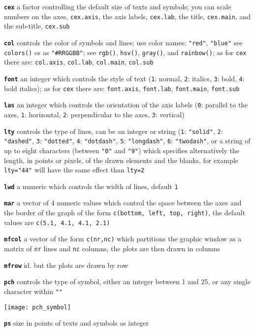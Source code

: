 \documentclass[8pt,landscape]{article}
\newcommand{\code}{\texttt}
\newcommand{\bcode}[1]{\texttt{\textbf{#1}}}
\begin{document}
\begin{multicols*}{3}
\bcode{cex}  a factor controlling the default size of texts and symbols; you can scale numbers on the axes, \code{cex.axis}, the axis labels, \code{cex.lab}, the title, \code{cex.main}, and the sub-title, \code{cex.sub}

\bcode{col}  controls the color of symbols and lines; use color names:
\code{"red"}, \code{"blue"} see \code{colors()} or as \code{"\#RRGGBB"};
see \code{rgb()}, \code{hsv()}, \code{gray()}, and \code{rainbow()}; as for \code{cex} there are: \code{col.axis}, \code{col.lab}, \code{col.main}, \code{col.sub}

\bcode{font}  an integer which controls the style of text (\code{1}: normal, \code{2}: italics, \code{3}: bold, \code{4}: bold italics); as for \code{cex} there are: \code{font.axis}, \code{font.lab}, \code{font.main}, \code{font.sub}

\bcode{las}  an integer which controls the orientation of the axis labels (\code{0}: parallel to the axes, \code{1}: horizontal, \code{2}: perpendicular to the axes, \code{3}: vertical)

\bcode{lty}  controls the type of lines, can be an integer or string (\code{1}: \code{"solid"}, \code{2}: \code{"dashed"}, \code{3}: \code{"dotted"}, \code{4}: \code{"dotdash"}, \code{5}: \code{"longdash"}, \code{6}: \code{"twodash"}, or a string of up to eight characters (between \code{"0"} and \code{"9"}) which specifies alternatively the length, in points or pixels, of the drawn elements and the blanks, for example \code{lty="44"} will have the same effect than \code{lty=2}

\bcode{lwd}  a numeric which controls the width of lines, default \code{1}

\bcode{mar}  a vector of 4 numeric values which control the space between the axes and the border of the graph of the form \code{c(bottom, left, top, right)}, the default values are \code{c(5.1, 4.1, 4.1, 2.1)}

\bcode{mfcol}  a vector of the form \code{c(nr,nc)} which partitions the graphic window as a matrix of \code{nr} lines and \code{nc} columns, the plots are then drawn in columns

\bcode{mfrow}  id. but the plots are drawn by row

\bcode{pch}  controls the type of symbol, either an integer between 1
and 25, or any single character within \code{""}

\samepage\texttt{[image: pch\_symbol]} 

\bcode{ps}   size in points of texts and symbols as integer


\end{multicols*}
\end{document}
